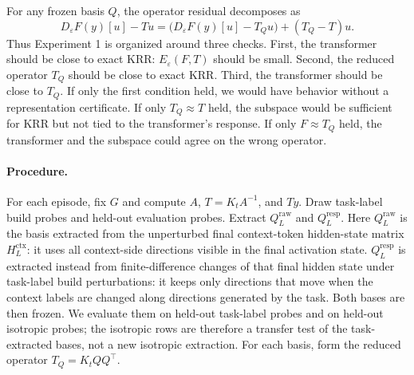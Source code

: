 \documentclass[11pt]{article}
\begin{document}
For any frozen basis \(Q\), the operator residual decomposes as
\[
D_\varepsilon F(y)[u]-Tu
=
\bigl(D_\varepsilon F(y)[u]-T_Qu\bigr)+(T_Q-T)u.
\]
Thus Experiment 1 is organized around three checks. First, the transformer should be close to
exact KRR: \(E_\varepsilon(F,T)\) should be small. Second, the reduced operator \(T_Q\) should be
close to exact KRR. Third, the transformer should be close to \(T_Q\). If only the first condition
held, we would have behavior without a representation certificate. If only \(T_Q\approx T\) held,
the subspace would be sufficient for KRR but not tied to the transformer's response. If only
\(F\approx T_Q\) held, the transformer and the subspace could agree on the wrong operator.

\paragraph{Procedure.}
For each episode, fix \(G\) and compute \(A\), \(T=K_tA^{-1}\), and \(Ty\). Draw task-label build
probes and held-out evaluation probes. Extract \(Q_L^{\mathrm{raw}}\) and \(Q_L^{\mathrm{resp}}\). Here
\(Q_L^{\mathrm{raw}}\) is the basis extracted from the unperturbed final context-token hidden-state
matrix \(H_L^{\mathrm{ctx}}\): it uses all context-side directions visible in the final activation state.
\(Q_L^{\mathrm{resp}}\) is extracted instead from finite-difference changes of that final hidden state
under task-label build perturbations: it keeps only directions that move when the context labels
are changed along directions generated by the task. Both bases are then frozen. We evaluate them
on held-out task-label probes and on held-out isotropic probes; the isotropic rows are therefore a
transfer test of the task-extracted bases, not a new isotropic extraction. For each basis, form the
reduced operator \(T_Q=K_tQQ^\top\).
\end{document}
